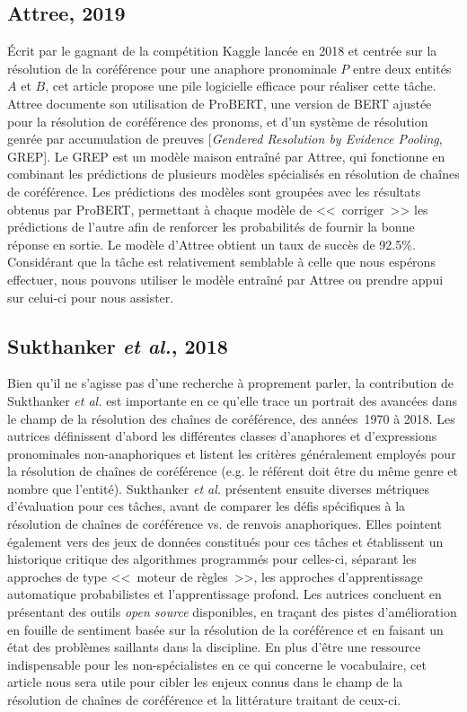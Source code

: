 \documentclass[hidelinks, 11pt, letterpaper]{article}
\newcommand{\guil}[1]{<<~{#1}~>>} %
\begin{document}
\subsection*{Attree, 2019}
Écrit par le gagnant de la compétition Kaggle lancée en 2018 et centrée sur la résolution de la coréférence pour une anaphore pronominale $P$ entre deux entités $A$ et $B$, cet article propose une pile logicielle efficace pour réaliser cette tâche.
Attree documente son utilisation de ProBERT, une version de BERT ajustée pour la résolution de coréférence des pronoms, et d'un système de résolution genrée par accumulation de preuves [\emph{Gendered Resolution by Evidence Pooling}, GREP].
Le GREP est un modèle maison entraîné par Attree, qui fonctionne en combinant les prédictions de plusieurs modèles spécialisés en résolution de chaînes de coréférence.
Les prédictions des modèles sont groupées avec les résultats obtenus par ProBERT, permettant à chaque modèle de \guil{corriger} les prédictions de l'autre afin de renforcer les probabilités de fournir la bonne réponse en sortie.
Le modèle d'Attree obtient un taux de succès de 92.5\%.
Considérant que la tâche est relativement semblable à celle que nous espérons effectuer, nous pouvons utiliser le modèle entraîné par Attree ou prendre appui sur celui-ci pour nous assister.

\subsection*{Sukthanker \emph{et al.}, 2018}
Bien qu'il ne s'agisse pas d'une recherche à proprement parler, la contribution de Sukthanker \emph{et al.} est importante en ce qu'elle trace un portrait des avancées dans le champ de la résolution des chaînes de coréférence, des années~1970 à 2018.
Les autrices définissent d'abord les différentes classes d'anaphores et d'expressions pronominales non-anaphoriques et listent les critères généralement employés pour la résolution de chaînes de coréférence (e.g. le référent doit être du même genre et nombre que l'entité).
Sukthanker \emph{et al.} présentent ensuite diverses métriques d'évaluation pour ces tâches, avant de comparer les défis spécifiques à la résolution de chaînes de coréférence vs. de renvois anaphoriques.
Elles pointent également vers des jeux de données constitués pour ces tâches et établissent un historique critique des algorithmes programmés pour celles-ci, séparant les approches de type \guil{moteur de règles}, les approches d'apprentissage automatique probabilistes et l'apprentissage profond.
Les autrices concluent en présentant des outils \emph{open source} disponibles, en traçant des pistes d'amélioration en fouille de sentiment basée sur la résolution de la coréférence et en faisant un état des problèmes saillants dans la discipline.
En plus d'être une ressource indispensable pour les non-spécialistes en ce qui concerne le vocabulaire, cet article nous sera utile pour cibler les enjeux connus dans le champ de la résolution de chaînes de coréférence et la littérature traitant de ceux-ci.

\newpage
\printbibliography[title=Références]
\end{document}
